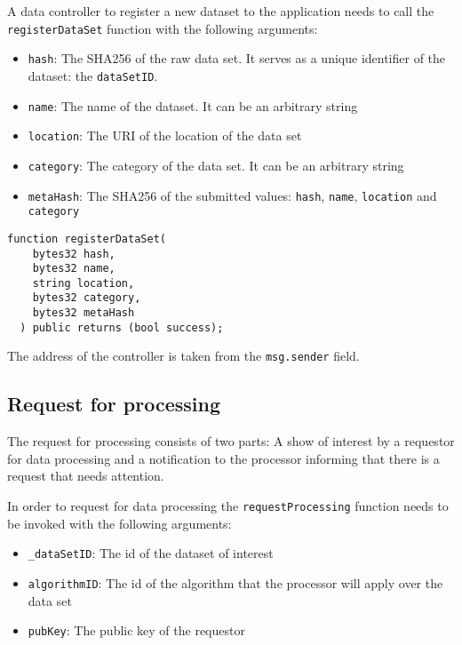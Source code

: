 A data controller to register a new dataset to the application needs to call the \verb|registerDataSet| function with the following arguments:

\begin{itemize}
  \item \verb|hash|: The SHA256 of the raw data set. It serves as a unique identifier of the dataset: the \verb|dataSetID|.
  \item \verb|name|: The name of the dataset. It can be an arbitrary string
  \item \verb|location|: The URI of the location of the data set
  \item \verb|category|: The category of the data set. It can be an arbitrary string
  \item \verb|metaHash|: The SHA256 of the submitted values: \verb|hash|, \verb|name|, \verb|location| and \verb|category|
\end{itemize}

\begin{lstlisting}[language=Solidity, caption={Data set registration function}]
  function registerDataSet(
    bytes32 hash,
    bytes32 name,
    string location,
    bytes32 category,
    bytes32 metaHash
  ) public returns (bool success);
\end{lstlisting}

The address of the controller is taken from the \verb|msg.sender| field.

\subsection{Request for processing}
\label{implemenation:contracts:req_pr}

The request for processing consists of two parts: A show of interest by a requestor for data processing and a notification to the processor informing that there is a request that needs attention.

In order to request for data processing the \verb|requestProcessing| function needs to be invoked with the following arguments:

\begin{itemize}
  \item \verb|_dataSetID|: The id of the dataset of interest
  \item \verb|algorithmID|: The id of the algorithm that the processor will apply over the data set
  \item \verb|pubKey|: The public key of the requestor
\end{itemize}

